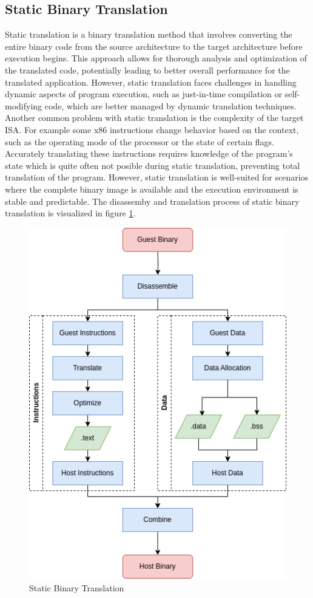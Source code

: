\subsection{Static Binary Translation}
Static translation is a binary translation method that involves converting the entire binary code from the source architecture to the target architecture before execution begins.
This approach allows for thorough analysis and optimization of the translated code, potentially leading to better overall performance for the translated application.
However, static translation faces challenges in handling dynamic aspects of program execution, such as just-in-time compilation or self-modifying code, which are better managed by dynamic translation techniques.
Another common problem with static translation is the complexity of the target \ac{ISA}.
For example some x86 instructions change behavior based on the context, such as the operating mode of the processor or the state of certain flags.
Accurately translating these instructions requires knowledge of the program's state which is quite often not posible during static translation, preventing total translation of the program.
However, static translation is well-suited for scenarios where the complete binary image is available and the execution environment is stable and predictable.
The disassemby and translation process of static binary translation is visualized in figure \ref{fig:static_binary_translation}.

\begin{figure}[ht]
    \centering
    \includegraphics[width=0.6\linewidth]{figures/sta_bin_trans}
    \caption{Static Binary Translation}
    \label{fig:static_binary_translation}
\end{figure}

